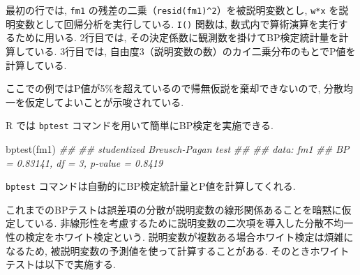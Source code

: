 \documentclass[
  letterpaper,
  xelatex,
  ja=standard, xelatex]{bxjsbook}
\newenvironment{Shaded}{\begin{snugshade}}{\end{snugshade}}
\newcommand{\AttributeTok}[1]{\textcolor[rgb]{0.40,0.45,0.13}{#1}}
\newcommand{\DecValTok}[1]{\textcolor[rgb]{0.68,0.00,0.00}{#1}}
\newcommand{\DocumentationTok}[1]{\textcolor[rgb]{0.37,0.37,0.37}{\textit{#1}}}
\newcommand{\FunctionTok}[1]{\textcolor[rgb]{0.28,0.35,0.67}{#1}}
\newcommand{\NormalTok}[1]{\textcolor[rgb]{0.00,0.23,0.31}{#1}}
\newcommand{\OtherTok}[1]{\textcolor[rgb]{0.00,0.23,0.31}{#1}}
\newcommand{\SpecialCharTok}[1]{\textcolor[rgb]{0.37,0.37,0.37}{#1}}
\begin{document}
\begin{Shaded}
\end{Shaded}

最初の行では, \texttt{fm1}
の残差の二乗（\texttt{resid(fm1)\^{}2}）を被説明変数とし, \texttt{w*x}
を説明変数として回帰分析を実行している. \texttt{I()} 関数は,
数式内で算術演算を実行するために用いる. 2行目では,
その決定係数に観測数を掛けてBP検定統計量を計算している. 3行目では,
自由度3（説明変数の数）のカイ二乗分布のもとでP値を計算している.

ここでの例ではP値が5\%を超えているので帰無仮説を棄却できないので,
分散均一を仮定してよいことが示唆されている.

R では \texttt{bptest} コマンドを用いて簡単にBP検定を実施できる.

\begin{Shaded}
\begin{Highlighting}[]
\FunctionTok{bptest}\NormalTok{(fm1)}
\DocumentationTok{\#\# }
\DocumentationTok{\#\#  studentized Breusch{-}Pagan test}
\DocumentationTok{\#\# }
\DocumentationTok{\#\# data:  fm1}
\DocumentationTok{\#\# BP = 0.83141, df = 3, p{-}value = 0.8419}
\end{Highlighting}
\end{Shaded}

\texttt{bptest} コマンドは自動的にBP検定統計量とP値を計算してくれる.

これまでのBPテストは誤差項の分散が説明変数の線形関係あることを暗黙に仮定している.
非線形性を考慮するために説明変数の二次項を導入した分散不均一性の検定をホワイト検定という.
説明変数が複数ある場合ホワイト検定は煩雑になるため,
被説明変数の予測値を使って計算することがある.
そのときホワイトテストは以下で実施する.
\end{document}

